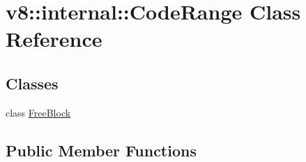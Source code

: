 \hypertarget{classv8_1_1internal_1_1_code_range}{}\section{v8\+:\+:internal\+:\+:Code\+Range Class Reference}
\label{classv8_1_1internal_1_1_code_range}
\subsection*{Classes}
\begin{DoxyCompactItemize}
\item 
class \hyperlink{classv8_1_1internal_1_1_code_range_1_1_free_block}{Free\+Block}
\end{DoxyCompactItemize}
\subsection*{Public Member Functions}

